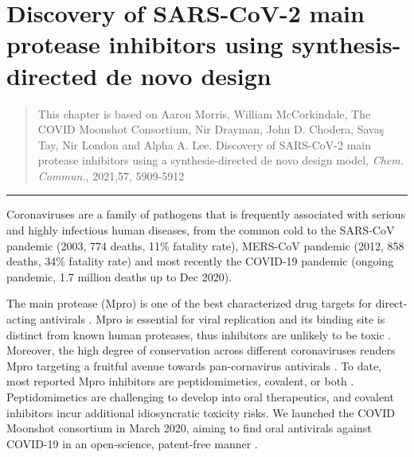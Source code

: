 \chapter{Discovery of SARS-CoV-2 main protease inhibitors using synthesis-directed de novo design} \label{ch:ranking}

\begin{quote}
    This chapter is based on Aaron Morris, William McCorkindale, The COVID Moonshot Consortium, Nir Drayman, John D. Chodera, Savaş Tay, Nir London and Alpha A. Lee. Discovery of SARS-CoV-2 main protease inhibitors using a synthesis-directed de novo design model, \textit{Chem. Commun.}, 2021,57, 5909-5912 
\end{quote}

\noindent\hfil\rule{0.5\textwidth}{.4pt}\hfil


Coronaviruses are a family of pathogens that is frequently associated with serious and highly infectious human diseases, from the common cold to the SARS-CoV pandemic (2003, 774 deaths, 11\% fatality rate), MERS-CoV pandemic (2012, 858 deaths, 34\% fatality rate) and most recently the COVID-19 pandemic (ongoing pandemic, 1.7 million deaths up to Dec 2020).

The main protease (Mpro) is one of the best characterized drug targets for direct-acting antivirals \cite{pillaiyar2016overview,cannalire2020targeting}. Mpro is essential for viral replication and its binding site is distinct from known human proteases, thus inhibitors are unlikely to be toxic \cite{jin2020structure,liu2020development}. Moreover, the high degree of conservation across different coronaviruses renders Mpro targeting a fruitful avenue towards pan-cornavirus antivirals \cite{ullrich2020sars}. To date, most reported Mpro inhibitors are peptidomimetics, covalent, or both \cite{cannalire2020targeting}. Peptidomimetics are challenging to develop into oral therapeutics, and covalent inhibitors incur additional idiosyncratic toxicity risks. We launched the COVID Moonshot consortium in March 2020, aiming to find oral antivirals against COVID-19 in an open-science, patent-free manner \cite{chodera2020crowdsourcing}.

